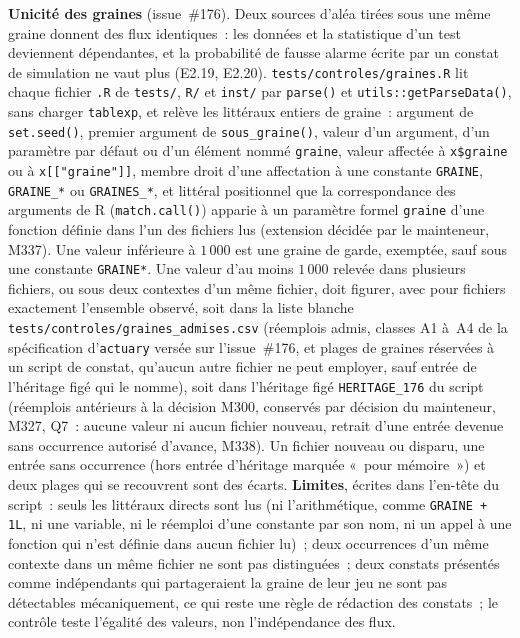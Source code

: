 \documentclass[a4paper,11pt]{article}
\newcommand{\code}[1]{\texttt{\small #1}}
\begin{document}
\textbf{Unicité des graines} (issue~\#176). Deux sources d'aléa tirées
sous une même graine donnent des flux identiques~: les données et la
statistique d'un test deviennent dépendantes, et la probabilité de fausse
alarme écrite par un constat de simulation ne vaut plus (E2.19, E2.20).
\code{tests/controles/graines.R} lit chaque fichier \code{*.R} de
\code{tests/}, \code{R/} et \code{inst/} par \code{parse()} et
\code{utils::getParseData()}, sans charger \code{tablexp}, et relève les
littéraux entiers de graine~: argument de \code{set.seed()}, premier
argument de \code{sous\_graine()}, valeur d'un argument, d'un paramètre par
défaut ou d'un élément nommé \code{graine}, valeur affectée à
\code{x\$graine} ou à \code{x[["graine"]]}, membre droit d'une affectation à une constante
\code{GRAINE}, \code{GRAINE\_*} ou \code{GRAINES\_*}, et littéral
positionnel que la correspondance des arguments de R
(\code{match.call()}) apparie à un paramètre formel \code{graine} d'une
fonction définie dans l'un des fichiers lus (extension décidée par le
mainteneur, M337). Une valeur inférieure à $1\,000$ est une graine de
garde, exemptée, sauf sous une constante \code{GRAINE*}. Une valeur d'au
moins $1\,000$ relevée dans plusieurs fichiers, ou sous deux contextes d'un
même fichier, doit figurer, avec pour fichiers exactement l'ensemble
observé, soit dans la liste blanche
\code{tests/controles/graines\_admises.csv} (réemplois admis, classes A1
à~A4 de la spécification d'\code{actuary} versée sur l'issue~\#176, et
plages de graines réservées à un script de constat, qu'aucun autre fichier
ne peut employer, sauf entrée de l'héritage figé qui le nomme), soit dans l'héritage figé \code{HERITAGE\_176} du script
(réemplois antérieurs à la décision M300, conservés par décision du
mainteneur, M327, Q7~: aucune valeur ni aucun fichier nouveau, retrait
d'une entrée devenue sans occurrence autorisé d'avance, M338). Un fichier
nouveau ou disparu, une entrée sans occurrence (hors entrée d'héritage
marquée «~pour mémoire~») et deux plages qui se recouvrent sont des écarts.
\textbf{Limites}, écrites dans l'en-tête du script~: seuls les littéraux
directs sont lus (ni l'arithmétique, comme \code{GRAINE + 1L}, ni une
variable, ni le réemploi d'une constante par son nom, ni un appel à une
fonction qui n'est définie dans aucun fichier lu)~; deux occurrences d'un
même contexte dans un même fichier ne sont pas distinguées~; deux constats
présentés comme indépendants qui partageraient la graine de leur jeu ne
sont pas détectables mécaniquement, ce qui reste une règle de rédaction des
constats~; le contrôle teste l'égalité des valeurs, non l'indépendance des
flux.
\end{document}
